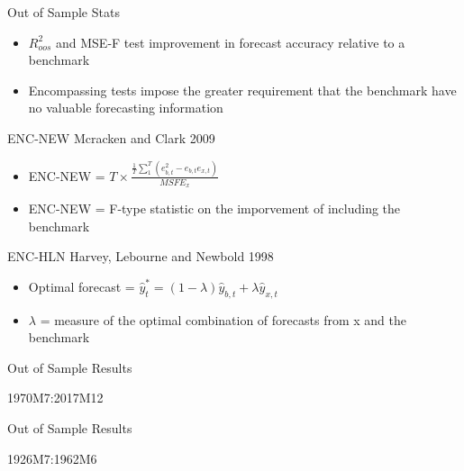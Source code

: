 \documentclass{beamer}
\begin{document}
\begin{frame}{Out of Sample Stats}
	\begin{itemize}
		\item $R_{oos}^{2}$ and MSE-F test improvement in forecast accuracy relative to a benchmark
		\item Encompassing tests impose the greater requirement that the benchmark have no valuable forecasting information
	\end{itemize}
	\begin{block}{ENC-NEW Mcracken and Clark 2009}
		\begin{itemize}
			\item ENC-NEW = $T\times \frac{\frac{1}{T}\sum_{1}^{T}(e_{b,t}^{2}-e_{b,t}e_{x,t})}{MSFE_{x}}$
			\item ENC-NEW = F-type statistic on the imporvement of including the benchmark
		\end{itemize}
	\end{block}
	\begin{block}{ENC-HLN Harvey, Lebourne and Newbold 1998}
		\begin{itemize}
			\item Optimal forecast = $\hat{y}^{*}_{t} = (1-\lambda)\hat{y}_{b,t} + \lambda \hat{y}_{x,t}$
			\item $\lambda$ = measure of the optimal combination of forecasts from x and the benchmark
		\end{itemize}
	\end{block}
\end{frame}

\begin{frame}{Out of Sample Results}
	\vspace{-12pt}
	\begin{table}
		\caption{1970M7:2017M12}
		\vspace{-6pt}
		\begin{adjustbox}{width=\textwidth}
			
		\end{adjustbox}
	\end{table}
\end{frame}

\begin{frame}{Out of Sample Results}
	\vspace{-12pt}
	\begin{table}
		\caption{1926M7:1962M6}
		\vspace{-6pt}
		\begin{adjustbox}{width=\textwidth}
			
		\end{adjustbox}
	\end{table}
\end{frame}
\end{document}
